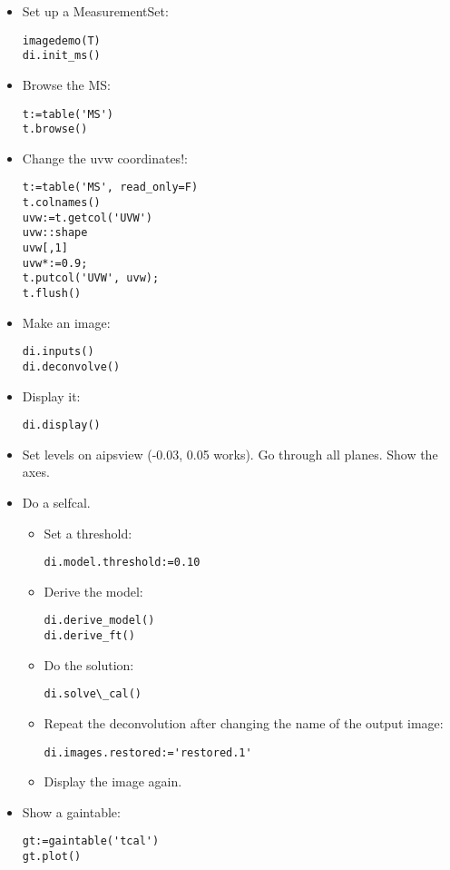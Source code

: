 \begin{itemize}
\item Set up a MeasurementSet: 
\begin{verbatim}
imagedemo(T)
di.init_ms()
\end{verbatim}
\item Browse the MS: 
\begin{verbatim}
t:=table('MS')
t.browse()
\end{verbatim}
\item Change the uvw coordinates!:
\begin{verbatim}
t:=table('MS', read_only=F)
t.colnames()
uvw:=t.getcol('UVW')
uvw::shape
uvw[,1]
uvw*:=0.9;
t.putcol('UVW', uvw);
t.flush()
\end{verbatim}
\item Make an image: 
\begin{verbatim}
di.inputs()
di.deconvolve()
\end{verbatim}
\item Display it:
\begin{verbatim}
di.display()
\end{verbatim}
\item Set levels on aipsview (-0.03, 0.05 works). Go through all planes. Show the axes.
\item Do a selfcal.
\begin{itemize}
\item Set a threshold: 
\begin{verbatim}
di.model.threshold:=0.10
\end{verbatim}
\item Derive the model: 
\begin{verbatim}
di.derive_model()
di.derive_ft()
\end{verbatim}
\item Do the solution: 
\begin{verbatim}
di.solve\_cal()
\end{verbatim}
\item Repeat the deconvolution after changing the name of the output
image: 
\begin{verbatim}
di.images.restored:='restored.1'
\end{verbatim}
\item Display the image again.
\end{itemize}
\item Show a gaintable:
\begin{verbatim}
gt:=gaintable('tcal')
gt.plot()
\end{verbatim}
\end{itemize}

